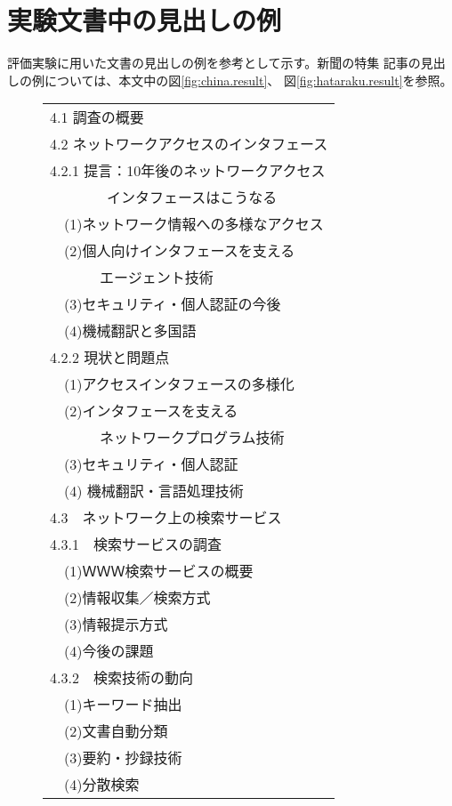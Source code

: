 \section{実験文書中の見出しの例}
\label{sect:実験文書の見出し}
\medskip
評価実験に用いた文書の見出しの例を参考として示す。新聞の特集
記事の見出しの例については、本文中の図\ref{fig:china.result}、
図\ref{fig:hataraku.result}を参照。

\begin{figure}[htbp]\footnotesize
  \begin{center}
  \begin{minipage}[t]{7cm}
    \begin{tabular}{l}
    4.1 調査の概要\\
    4.2 ネットワークアクセスのインタフェース\\
    4.2.1 提言：10年後のネットワークアクセス\\
    \ \ \ \ \ \ \ \ インタフェースはこうなる\\
    \ \ (1)ネットワーク情報への多様なアクセス\\
    \ \ (2)個人向けインタフェースを支える\\
    \ \ \ \ \ \ \ エージェント技術\\
    \ \ (3)セキュリティ・個人認証の今後\\
    \ \ (4)機械翻訳と多国語\\
    4.2.2 現状と問題点\\
    \ \ (1)アクセスインタフェースの多様化\\
    \ \ (2)インタフェースを支える\\
    \ \ \ \ \ \ \ ネットワークプログラム技術\\
    \ \ (3)セキュリティ・個人認証\\
    \ \ (4) 機械翻訳・言語処理技術\\
    4.3　ネットワーク上の検索サービス\\
    4.3.1　検索サービスの調査\\
    \ \ (1)ＷＷＷ検索サービスの概要\\
    \ \ (2)情報収集／検索方式\\
    \ \ (3)情報提示方式\\
    \ \ (4)今後の課題\\
    4.3.2　検索技術の動向\\
    \ \ (1)キーワード抽出\\
    \ \ (2)文書自動分類\\
    \ \ (3)要約・抄録技術\\
    \ \ (4)分散検索\\

\end{tabular}
\end{minipage}
\end{center}
\end{figure}
